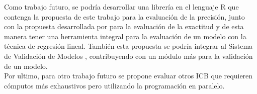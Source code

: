 Como trabajo futuro, se podría desarrollar una librería en el lenguaje R que contenga la propuesta de este trabajo para la evaluación de la precisión, junto con la propuesta desarrollada por \textcite{zacarias-2023} para la evaluación de la exactitud y de esta manera tener una herramienta integral para la evaluación de un modelo con la técnica de regresión lineal. También esta propuesta se podría integrar al Sistema de Validación de Modelos \parencite{mazun-2014}, contribuyendo con un módulo más para la validación de un modelo. \\


Por ultimo, para otro trabajo futuro se propone evaluar otros ICB que requieren cómputos más exhaustivos pero utilizando la programación en paralelo.\\








